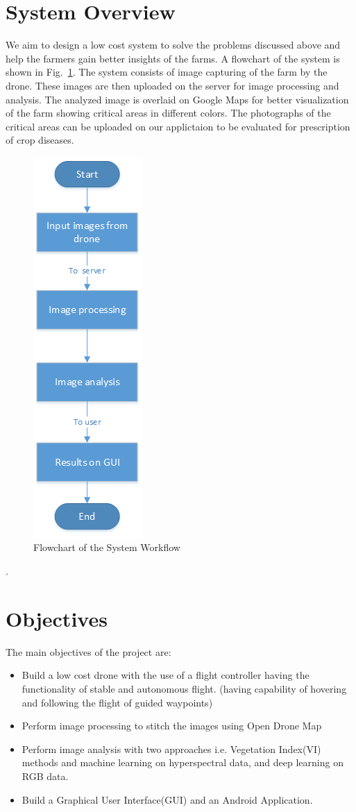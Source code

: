 \section{System Overview}
We aim to design a low cost system to solve the problems discussed above and help the farmers gain better insights of the farms. A flowchart of the system is shown in Fig.~\ref{fig: extra-1}. The system consists of image capturing of the farm by the drone. These images are then uploaded on the server for image processing and analysis. The analyzed image is  overlaid on Google Maps for better visualization of the farm showing critical areas in different colors. The photographs of the critical areas can be uploaded on our applictaion to be evaluated for prescription of crop diseases.
\begin{figure}[!h]
	\includegraphics[height=0.9\linewidth]{extra-1}
	\centering
	\caption{\label{fig: extra-1}Flowchart of the System Workflow}
\end{figure}.


\section{Objectives}

The main objectives of the project are:

\begin{itemize}
	\item Build a low cost drone with the use of a flight controller having the functionality of stable and autonomous flight. (having capability of hovering and following the flight of guided waypoints)
	\item Perform image processing to stitch the images using Open Drone Map
	\item Perform image analysis with two approaches i.e. Vegetation 	Index(VI) methods and machine learning on hyperspectral data, and deep learning on RGB data.
	\item Build a Graphical User Interface(GUI) and an Android Application.
\end{itemize}


